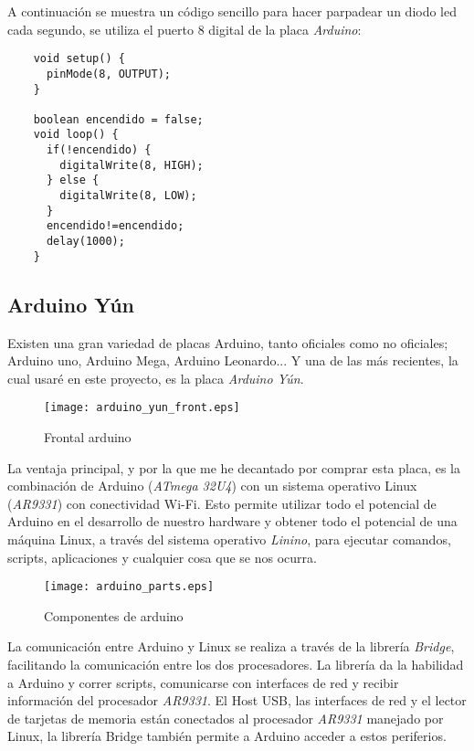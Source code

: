 A continuación se muestra un código sencillo para hacer parpadear un diodo led cada segundo, se utiliza el puerto 8 digital de la placa \emph{Arduino}:

\begin{lstlisting}
    void setup() {
      pinMode(8, OUTPUT);
    }

    boolean encendido = false;
    void loop() {
      if(!encendido) {
        digitalWrite(8, HIGH);
      } else {
        digitalWrite(8, LOW);
      }
      encendido!=encendido;
      delay(1000);
    }
\end{lstlisting}

\subsection{Arduino Yún}

Existen una gran variedad de placas Arduino, tanto oficiales como no oficiales; Arduino uno, Arduino Mega, Arduino Leonardo... Y una de las más recientes, la cual usaré en este proyecto, es la placa \emph{Arduino Yún}.

\begin{figure}[h!]
    \centering
    \texttt{[image: arduino\_yun\_front.eps]}
    \caption{Frontal arduino}\label{fig:arduino-yun-front}
\end{figure}

La ventaja principal, y por la que me he decantado por comprar esta placa, es la combinación de Arduino (\emph{ATmega 32U4}) con un sistema operativo Linux (\emph{AR9331}) con conectividad Wi-Fi. Esto permite utilizar todo el potencial de Arduino en el desarrollo de nuestro hardware y obtener todo el potencial de una máquina Linux, a través del sistema operativo \emph{Linino}, para ejecutar comandos, scripts, aplicaciones y cualquier cosa que se nos ocurra.

\begin{figure}[h!]
    \centering
    \texttt{[image: arduino\_parts.eps]}
    \caption{Componentes de arduino}\label{fig:arduino-parts}
\end{figure}

La comunicación entre Arduino y Linux se realiza a través de la librería \emph{Bridge}, facilitando la comunicación entre los dos procesadores. La librería da la habilidad a Arduino y correr scripts, comunicarse con interfaces de red y recibir información del procesador \emph{AR9331}. El Host USB, las interfaces de red y el lector de tarjetas de memoria están conectados al procesador \emph{AR9331} manejado por Linux, la librería Bridge también permite a Arduino acceder a estos periferios.


